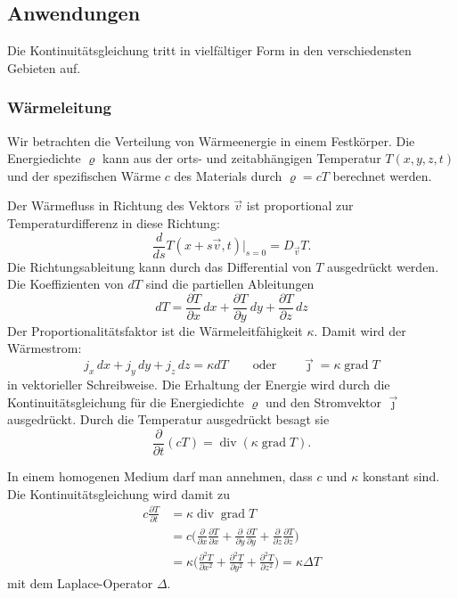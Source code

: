 %
%
\subsection{Anwendungen}
Die Kontinuitätsgleichung tritt in vielfältiger Form in den verschiedensten
Gebieten auf.

%
%
\subsubsection{Wärmeleitung}
Wir betrachten die Verteilung von Wärmeenergie in einem Festkörper.
Die Energiedichte $\varrho$ kann aus der orts- und zeitabhängigen
Temperatur $T(x,y,z,t)$ und der spezifischen Wärme $c$ des Materials
durch $\varrho = cT$ berechnet werden.

Der Wärmefluss in Richtung des Vektors $\vec{v}$ ist proportional
zur Temperaturdifferenz in diese Richtung:
\[
\frac{d}{ds}
T(x+s\vec{v},t)\bigg|_{s=0}
=
D_{\vec{v}} T.
\]
Die Richtungsableitung kann durch das Differential von $T$
ausgedrückt werden.
Die Koeffizienten von $dT$ sind die partiellen Ableitungen
\[
dT
=
\frac{\partial T}{\partial x}\,dx
+
\frac{\partial T}{\partial y}\,dy
+
\frac{\partial T}{\partial z}\,dz
\]
Der Proportionalitätsfaktor ist die Wärmeleitfähigkeit $\kappa$.
Damit wird der Wärmestrom:
\[
j_x\,dx
+
j_y\,dy
+
j_z\,dz
=
\kappa
dT
\qquad\text{oder}\qquad
\vec{\jmath}
=
\kappa
\operatorname{grad} T
\]
in vektorieller Schreibweise.
Die Erhaltung der Energie wird durch die Kontinuitätsgleichung
für die Energiedichte $\varrho$ und den Stromvektor $\vec{\jmath}$
ausgedrückt.
Durch die Temperatur ausgedrückt besagt sie
\[
\frac{\partial }{\partial t}
(cT)
=
\operatorname{div}(\kappa\operatorname{grad}T).
\]

In einem homogenen Medium darf man annehmen, dass $c$ und $\kappa$ konstant
sind.
Die Kontinuitätsgleichung wird damit zu
\begin{align*}
c\frac{\partial T}{\partial t}
&=
\kappa
\operatorname{div}\operatorname{grad}T
\\
&=
c
\biggl(
\frac{\partial}{\partial x}
\frac{\partial T}{\partial x}
+
\frac{\partial}{\partial y}
\frac{\partial T}{\partial y}
+
\frac{\partial}{\partial z}
\frac{\partial T}{\partial z}
\biggr)
\\
&=
\kappa
\biggl(
\frac{\partial^2 T}{\partial x^2}
+
\frac{\partial^2 T}{\partial y^2}
+
\frac{\partial^2 T}{\partial z^2}
\biggr)
=
\kappa \Delta T
\end{align*}
mit dem Laplace-Operator $\Delta$.

